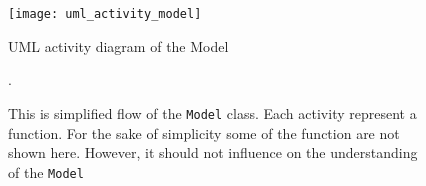 \begin{figure}[H]
	\texttt{[image: uml\_activity\_model]}
	\caption{UML activity diagram of the Model}
	\caption*{This is simplified flow of the \lstinline{Model} class.
	Each activity represent a function. For the sake of simplicity some of the function
	are not shown here. However, it should not influence on the understanding
	of the \lstinline{Model}}.
	\label{fig:uml_activity_model}
\end{figure}
%
%






